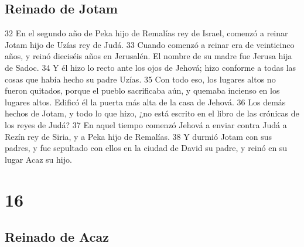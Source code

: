 \section*{Reinado de Jotam}

 
32 En el segundo año de Peka hijo de Remalías rey de Israel, comenzó a reinar Jotam hijo de Uzías rey de Judá.
33 Cuando comenzó a reinar era de veinticinco años, y reinó dieciséis años en Jerusalén. El nombre de su madre fue Jerusa hija de Sadoc.
34 Y él hizo lo recto ante los ojos de Jehová; hizo conforme a todas las cosas que había hecho su padre Uzías.
35 Con todo eso, los lugares altos no fueron quitados, porque el pueblo sacrificaba aún, y quemaba incienso en los lugares altos. Edificó él la puerta más alta de la casa de Jehová.
36 Los demás hechos de Jotam, y todo lo que hizo, ¿no está escrito en el libro de las crónicas de los reyes de Judá?
37 En aquel tiempo comenzó Jehová a enviar contra Judá a Rezín rey de Siria, y a Peka hijo de Remalías.
38 Y durmió Jotam con sus padres, y fue sepultado con ellos en la ciudad de David su padre, y reinó en su lugar Acaz su hijo.

\chapter{16}

\section*{Reinado de Acaz}

 

